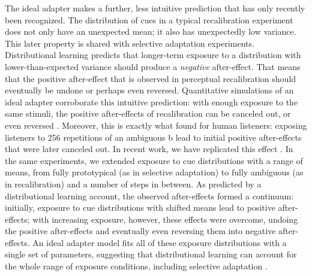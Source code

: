 The ideal adapter makes a further, less intuitive prediction that has only recently been recognized. The distribution of cues in a typical recalibration experiment does not only have an unexpected mean; it also has unexpectedly low variance. This later property is shared with selective adaptation experiments. Distributional learning predicts that longer-term exposure to a distribution with lower-than-expected variance should produce a \emph{negative} after-effect. That means that the positive after-effect that is observed in perceptual recalibration should eventually be undone or perhaps even reversed. Quantitative simulations of an ideal adapter corroborate this intuitive prediction: with enough exposure to the same stimuli, the positive after-effects of recalibration can be canceled out, or even reversed \cite[pp. 164-6]{Kleinschmidt2015}.  Moreover, this is exactly what \textcite{Vroomen2007} found for human listeners: exposing listeners to 256 repetitions of an ambiguous \ph b lead to initial positive after-effects that were later canceled out.  In recent work, we have replicated this effect \cite{Kleinschmidt2012c}. In the same experiments, we extended exposure to cue distributions with a range of means, from fully prototypical (as in selective adaptation) to fully ambiguous (as in recalibration) and a number of steps in between.  As predicted by a distributional learning account, the observed after-effects formed a continuum: initially, exposure to cue distributions with shifted means lead to positive after-effects; with increasing exposure, however, these effects were overcome, undoing the positive after-effects and eventually even reversing them into negative after-effects. An ideal adapter model fits all of these exposure distributions with a single set of parameters, suggesting that distributional learning can account for the whole range of exposure conditions, including selective adaptation \cite{Kleinschmidt2015}.  

